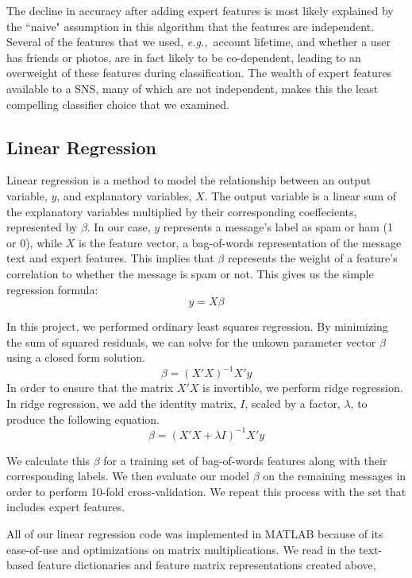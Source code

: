 \documentclass[preprint]{acm_proc_article-sp}
\newcommand{\eg}{{\em e.g.,}~}
\begin{document}
The decline in accuracy after adding expert features is most likely explained by the ``naive" assumption in this 
algorithm that the features are independent. Several of the features that we used, \eg{account lifetime, 
and whether a user has friends or photos}, are in fact likely to be co-dependent, leading to an overweight of 
these features during classification. The wealth of expert features available to a SNS, many of which are 
not independent, makes this the least compelling classifier choice that we examined.



\subsection{Linear Regression}

Linear regression is a method to model the relationship between an output variable, 
$y$, and explanatory variables, $X$. The output variable is a linear sum of the explanatory 
variables multiplied by their corresponding coeffecients, represented by $\beta$. 
In our case, $y$ represents a message's label as spam or ham (1 or 0), 
while $X$ is the feature vector, a bag-of-words representation of the message text and expert features. 
This implies that $\beta$ represents the weight of a feature's correlation to whether 
the message is spam or not. This gives us the simple regression formula: $$y=X\beta$$

In this project, we performed ordinary least squares regression. By minimizing the sum of squared 
residuals, we can solve for the unkown parameter vector $\beta$ using a closed form solution. 
$$\beta=(X'X)^{-1}X'y$$ In order to ensure that the matrix $X'X$ is invertible, we perform ridge regression. 
In ridge regression, we add the identity matrix, $I$, scaled by a factor, $\lambda$, to 
produce the following equation. $$\beta=(X'X+\lambda I)^{-1}X'y$$

We calculate this $\beta$ for a training set of bag-of-words features along with their corresponding labels. 
We then evaluate our model $\beta$ on the remaining messages in order to perform 10-fold cross-validation. 
We repeat this process with the set that includes expert features.

All of our linear regression code was implemented in MATLAB because of its ease-of-use 
and optimizations on matrix multiplications. We read in the text-based feature dictionaries and feature matrix
representations created above, 

\end{document}
